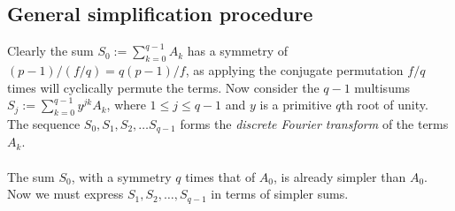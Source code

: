 \documentclass{article}
\begin{document}
\subsection{General simplification procedure}
    Clearly the sum $ S_0 := \sum_{k = 0}^{q - 1} A_k $ has a symmetry of $ (p - 1)/(f/q) = q(p - 1)/f $, as applying the conjugate permutation $ f/q $ times will cyclically permute the terms. Now consider the $ q - 1 $ multisums $ S_j := \sum_{k = 0}^{q - 1} y^{jk} A_k $, where $ 1 \le j \le q - 1 $ and $ y $ is a primitive $ q $th root of unity. The sequence $ S_0, S_1, S_2, \dots S_{q - 1} $ forms the \textit{discrete Fourier transform} of the terms $ A_k $.\\
    \\
    The sum $ S_0 $, with a symmetry $ q $ times that of $ A_0 $, is already simpler than $ A_0 $. Now we must express $ S_1, S_2, \dots, S_{q - 1} $ in terms of simpler sums.\\
\end{document}
